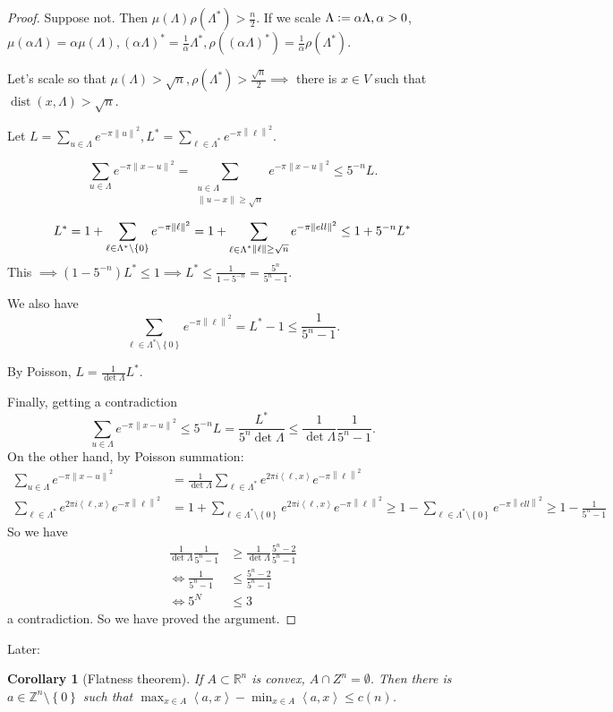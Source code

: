 \documentclass{report}
\newcommand{\R}{\mathbb{R}}
\newcommand{\Z}{\mathbb{Z}}
\def \dist {\operatorname{dist}}
\def \dist {\operatorname{dist}}
\newcommand{\inner}[2]{\left\langle #1, #2\right\rangle}
\newcommand{\norm}[1]{\left\| #1 \right\|}
\newcommand{\set}[1]{\left\{ #1 \right\}}
\newcommand{\defeq}{\vcentcolon=}
\newtheorem{corollary}{Corollary}[section]
\theoremstyle{definition}
\theoremstyle{remark}
\numberwithin{equation}{section}
\begin{document}
\begin{proof}
    Suppose not. Then $\mu(\Lambda)\rho(\Lambda^*) > \frac{n}{2}$. If we scale $\Lambda \defeq \alpha \Lambda, \alpha > 0$, $\mu(\alpha\Lambda) = \alpha \mu(\Lambda), (\alpha\Lambda)^* = \frac{1}{\alpha}\Lambda^*, \rho((\alpha\Lambda)^*) = \frac{1}{\alpha}\rho(\Lambda^*)$.

    Let's scale so that $\mu(\Lambda) > \sqrt{n}, \rho(\Lambda^*) > \frac{\sqrt{n}}{2} \implies$ there is $x \in V$ such that $\dist(x, \Lambda) > \sqrt{n}$.

    Let $L = \sum_{u\in\Lambda} e^{-\pi\norm{u}^2}, L^* = \sum_{\ell \in \Lambda^*}e^{-\pi\norm{\ell}^2}$.

    \[ 
        \sum_{u \in \Lambda}e^{-\pi\norm{x - u}^2} = \sum_{\substack{u \in \Lambda \\ \norm{u - x} \geq \sqrt{n}}} e^{-\pi\norm{x - u}^2} \leq 5^{-n}L.
    \]

    \[L^* = 1 + \sum_{\ell \in \Lambda^* \setminus \set{0}} e^{-\pi\norm{\ell}^2} = 1 + \sum_{\substack{\ell \in \Lambda^*}\\ \norm{\ell} \geq \sqrt{n}} e^{-\pi\norm{ell}^2} \leq 1 + 5^{-n}L^*\]
    This $\implies (1 - 5^{-n})L^* \leq 1 \implies L^* \leq \frac{1}{1 - 5^{-n}} = \frac{5^n}{5^n - 1}$.

    We also have \[\sum_{\ell \in \Lambda^* \setminus \set{0}} e^{-\pi\norm{\ell}^2} = L^* - 1 \leq \frac{1}{5^n-1}.\]

    By Poisson, $L = \frac{1}{\det \Lambda}L^*$.

    Finally, getting a contradiction \[
        \sum_{u \in \Lambda}e^{-\pi\norm{x - u}^2} \leq 5^{-n}L = \frac{L^*}{5^n\det\Lambda}\leq \frac{1}{\det\Lambda}\frac{1}{5^n-1}.    
    \]
    On the other hand, by Poisson summation: \begin{align*}
        \sum_{u \in \Lambda}e^{-\pi\norm{x - u}^2} & = \frac{1}{\det\Lambda}\sum_{\ell \in \Lambda^*} e^{2\pi i \inner{\ell}{x}}e^{-\pi\norm{\ell}^2} \\
        \sum_{\ell \in \Lambda^*} e^{2\pi i\inner{\ell}{x}} e^{-\pi\norm{\ell}^2} & = 1 + \sum_{\ell \in \Lambda^* \setminus \set{0}} e^{2\pi i\inner{\ell}{x}} e^{-\pi\norm{\ell}^2} \geq 1 - \sum_{\ell \in \Lambda^* \setminus \set{0}} e^{-\pi\norm{ell}^2} \geq 1 - \frac{1}{5^n-1}
    \end{align*}
    So we have \begin{align*}
        \frac{1}{\det\Lambda}\frac{1}{5^n-1} & \geq \frac{1}{\det\Lambda}\frac{5^n-2}{5^n-1} \\
        \iff \frac{1}{5^n-1} & \leq \frac{5^n-2}{5^n-1} \\
        \iff 5^N & \leq 3 
    \end{align*}
    a contradiction. So we have proved the argument.
\end{proof}

Later:
\begin{corollary}[Flatness theorem]
    If $A \subset \R^n$ is convex, $A \cap Z^n = \emptyset$. Then there is $a \in \Z^n \setminus \set{0}$ such that $\max_{x\in A} \inner{a}{x} - \min_{x\in A} \inner{a}{x} \leq c(n)$.
\end{corollary}
\end{document}
